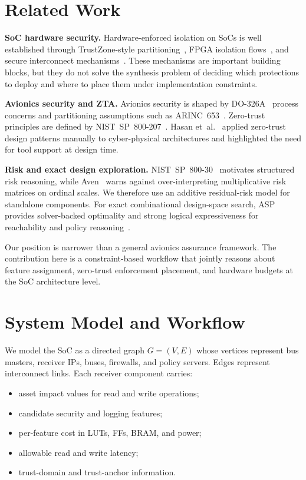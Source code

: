 \documentclass[conference]{IEEEtran}
\begin{document}
\section{Related Work}

\textbf{SoC hardware security.}
Hardware-enforced isolation on SoCs is well established through
TrustZone-style partitioning~\cite{arm_tz}, FPGA isolation flows~\cite{xilinx_idf},
and secure interconnect mechanisms~\cite{fiorin_noc}. These mechanisms are
important building blocks, but they do not solve the synthesis problem of
deciding which protections to deploy and where to place them under
implementation constraints.

\textbf{Avionics security and ZTA.}
Avionics security is shaped by DO-326A~\cite{do326a} process concerns and
partitioning assumptions such as ARINC~653~\cite{arinc653}. Zero-trust
principles are defined by NIST~SP~800-207~\cite{nist_zta}. Hasan
et~al.~\cite{hasan_saecps,hasan_jsys} applied zero-trust design patterns
manually to cyber-physical architectures and highlighted the need for tool
support at design time.

\textbf{Risk and exact design exploration.}
NIST~SP~800-30~\cite{nist_sp80030} motivates structured risk reasoning, while
Aven~\cite{aven_riskmatrix} warns against over-interpreting multiplicative
risk matrices on ordinal scales. We therefore use an additive residual-risk
model for standalone components. For exact combinational design-space search,
ASP provides solver-backed optimality and strong logical expressiveness for
reachability and policy reasoning~\cite{gebser_asp}.

Our position is narrower than a general avionics assurance framework. The
contribution here is a constraint-based workflow that jointly reasons about
feature assignment, zero-trust enforcement placement, and hardware budgets at
the SoC architecture level.

\section{System Model and Workflow}

We model the SoC as a directed graph $G=(V,E)$ whose vertices represent bus
masters, receiver IPs, buses, firewalls, and policy servers. Edges represent
interconnect links. Each receiver component carries:
\begin{itemize}
\item asset impact values for read and write operations;
\item candidate security and logging features;
\item per-feature cost in LUTs, FFs, BRAM, and power;
\item allowable read and write latency;
\item trust-domain and trust-anchor information.
\end{itemize}
\end{document}
